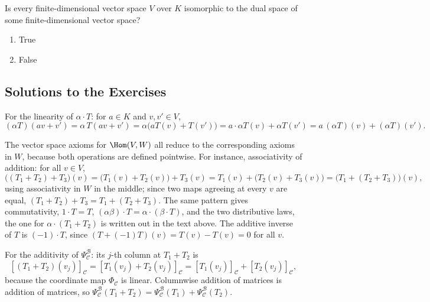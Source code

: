 \begin{exercise}
\label{exc:every_finite_dim_is_dual_sc}
Is every finite-di\-men\-sional vector space $V$ over $K$ isomorphic to the dual space of some finite-di\-men\-sional vector space?
\begin{enumerate}
    \item True
    \item False
\end{enumerate}
\end{exercise}

\subsection{Solutions to the Exercises}
\label{sec:solutions_hom_dual}

\begin{exercisesolution}
\label{sol:hom_axioms}
For the linearity of $\alpha \cdot T$: for $a \in K$ and $v, v' \in V$,
\[
(\alpha T)(a v + v') = \alpha \, T(av + v') = \alpha \big( a T(v) + T(v') \big) = a \cdot \alpha T(v) + \alpha T(v') = a \, (\alpha T)(v) + (\alpha T)(v').
\]

The vector space axioms for $\Hom(V,W)$ all reduce to the corresponding axioms in $W$, because both operations are defined pointwise. For instance, associativity of addition: for all $v \in V$,
\[
\big((T_1 + T_2) + T_3\big)(v) = \big(T_1(v) + T_2(v)\big) + T_3(v) = T_1(v) + \big(T_2(v) + T_3(v)\big) = \big(T_1 + (T_2 + T_3)\big)(v),
\]
using associativity in $W$ in the middle; since two maps agreeing at every $v$ are equal, $(T_1 + T_2) + T_3 = T_1 + (T_2 + T_3)$. The same pattern gives commutativity, $1 \cdot T = T$, $(\alpha\beta) \cdot T = \alpha \cdot (\beta \cdot T)$, and the two distributive laws, the one for $\alpha \cdot (T_1 + T_2)$ is written out in the text above. The additive inverse of $T$ is $(-1) \cdot T$, since $(T + (-1)T)(v) = T(v) - T(v) = 0$ for all $v$.

For the additivity of $\Psi_{\mathcal{C}}^{\mathcal{B}}$: its $j$-th column at $T_1 + T_2$ is
\[
[(T_1 + T_2)(v_j)]_{\mathcal{C}} = [T_1(v_j) + T_2(v_j)]_{\mathcal{C}} = [T_1(v_j)]_{\mathcal{C}} + [T_2(v_j)]_{\mathcal{C}},
\]
because the coordinate map $\Phi_{\mathcal{C}}$ is linear. Columnwise addition of matrices is addition of matrices, so $\Psi_{\mathcal{C}}^{\mathcal{B}}(T_1 + T_2) = \Psi_{\mathcal{C}}^{\mathcal{B}}(T_1) + \Psi_{\mathcal{C}}^{\mathcal{B}}(T_2)$.
\end{exercisesolution}

